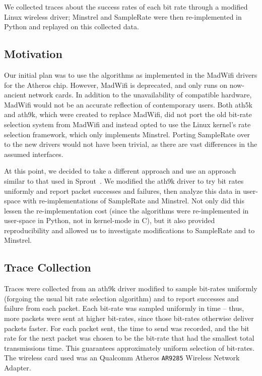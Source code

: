 \documentclass[twocolumn,10pt]{article}
\begin{document}
We collected traces about the success rates of each bit rate through a
modified Linux wireless driver; Minstrel and SampleRate were then
re-implemented in Python and replayed on this collected data.

\subsection{Motivation}

Our initial plan was to use the algorithms as implemented in the
MadWifi drivers for the Atheros chip.  However, MadWifi is
deprecated, and only runs on now-ancient network cards.  In addition to
the unavailability of compatible hardware, MadWifi would not be an
accurate reflection of contemporary users.  Both ath5k and ath9k, which
were created to replace MadWifi, did not port the old bit-rate
selection system from MadWifi and instead opted to use the Linux
kernel's rate selection framework, which only implements Minstrel.
Porting SampleRate over to the new drivers would not have been
trivial, as there are vast differences in the assumed interfaces.

At this point, we decided to take a different approach and use an
approach similar to that used in Sprout~\cite{sprout}.  We modified
the ath9k driver to try bit rates uniformly and report packet
successes and failures, then analyze this data in user-space with
re-implementations of SampleRate and Minstrel.  Not only did this
lessen the re-implementation cost (since the algorithms were
re-implemented in user-space in Python, not in kernel-mode in C), but
it also provided reproducibility and allowed us to investigate
modifications to SampleRate and to Minstrel.

\subsection{Trace Collection}

Traces were collected from an ath9k driver modified to sample
bit-rates uniformly (forgoing the usual bit rate selection algorithm)
and to report successes and failure from each packet.  Each bit-rate
was sampled uniformly in time -- thus, more packets were sent at
higher bit-rates, since those bit-rates otherwise deliver packets
faster.  For each packet sent, the time to send was recorded, and the
bit rate for the next packet was chosen to be the bit-rate that had
the smallest total transmissions time.  This guarantees approximately
uniform selection of bit-rates.  The wireless card used was an
Qualcomm Atheros \texttt{AR9285} Wireless Network Adapter.
\end{document}

